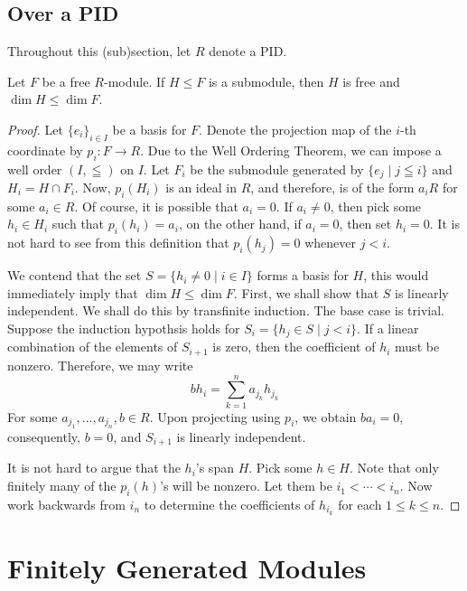 \subsection{Over a PID}

Throughout this (sub)section, let $R$ denote a PID.

\begin{theorem}
    Let $F$ be a free $R$-module. If $H\le F$ is a submodule, then $H$ is free and $\dim H\le\dim F$.
\end{theorem}
\begin{proof}
Let $\{e_i\}_{i\in I}$ be a basis for $F$. Denote the projection map of the $i$-th coordinate by $p_i: F\to R$. Due to the Well Ordering Theorem, we can impose a well order $(I,\leqq)$ on $I$. Let $F_i$ be the submodule generated by $\{e_j\mid j\leqq i\}$ and $H_i = H\cap F_i$. Now, $p_i(H_i)$ is an ideal in $R$, and therefore, is of the form $a_iR$ for some $a_i\in R$. Of course, it is possible that $a_i = 0$. If $a_i\ne 0$, then pick some $h_i\in H_i$ such that $p_i(h_i) = a_i$, on the other hand, if $a_i = 0$, then set $h_i = 0$. It is not hard to see from this definition that $p_i(h_j) = 0$ whenever $j < i$.

We contend that the set $S = \{h_i\ne 0\mid i\in I\}$ forms a basis for $H$, this would immediately imply that $\dim H\le\dim F$. First, we shall show that $S$ is linearly independent. We shall do this by transfinite induction. The base case is trivial. Suppose the induction hypothsis holds for $S_i = \{h_j\in S\mid j < i\}$. If a linear combination of the elements of $S_{i + 1}$ is zero, then the coefficient of $h_i$ must be nonzero. Therefore, we may write 
\begin{equation*}
    bh_i = \sum_{k = 1}^n a_{j_k}h_{j_k}
\end{equation*}
For some $a_{j_1},\ldots,a_{j_n},b\in R$. Upon projecting using $p_i$, we obtain $ba_i = 0$, consequently, $b = 0$, and $S_{i + 1}$ is linearly independent.

It is not hard to argue that the $h_i$'s span $H$. Pick some $h\in H$. Note that only finitely many of the $p_i(h)$'s will be nonzero. Let them be $i_1 < \cdots < i_n$. Now work backwards from $i_n$ to determine the coefficients of $h_{i_k}$ for each $1\le k\le n$.
\end{proof}

\section{Finitely Generated Modules}

